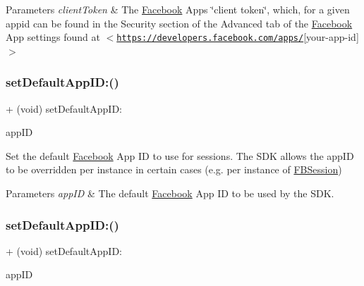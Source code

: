 \begin{DoxyParams}{Parameters}
{\em client\+Token} & The \hyperlink{interfaceFacebook}{Facebook} App\textquotesingle{}s \char`\"{}client token\char`\"{}, which, for a given appid can be found in the Security section of the Advanced tab of the \hyperlink{interfaceFacebook}{Facebook} App settings found at $<$\href{https://developers.facebook.com/apps/}{\tt https\+://developers.\+facebook.\+com/apps/}\mbox{[}your-\/app-\/id\mbox{]}$>$ \\
\hline
\end{DoxyParams}
\mbox{\label{interfaceFBSettings_aae75641f83b1caf710efd2ce72b6eb67}} 
\subsubsection{\texorpdfstring{set\+Default\+App\+I\+D\+:()}{setDefaultAppID:()}\hspace{0.1cm}{\footnotesize\ttfamily [1/5]}}
{\footnotesize\ttfamily + (void) set\+Default\+App\+I\+D\+: \begin{DoxyParamCaption}\item[{(N\+S\+String $\ast$)}]{app\+ID }\end{DoxyParamCaption}}

Set the default \hyperlink{interfaceFacebook}{Facebook} App ID to use for sessions. The S\+DK allows the app\+ID to be overridden per instance in certain cases (e.\+g. per instance of \hyperlink{interfaceFBSession}{F\+B\+Session})


\begin{DoxyParams}{Parameters}
{\em app\+ID} & The default \hyperlink{interfaceFacebook}{Facebook} App ID to be used by the S\+DK. \\
\hline
\end{DoxyParams}
\mbox{\label{interfaceFBSettings_aae75641f83b1caf710efd2ce72b6eb67}} 
\subsubsection{\texorpdfstring{set\+Default\+App\+I\+D\+:()}{setDefaultAppID:()}\hspace{0.1cm}{\footnotesize\ttfamily [2/5]}}
{\footnotesize\ttfamily + (void) set\+Default\+App\+I\+D\+: \begin{DoxyParamCaption}\item[{(N\+S\+String $\ast$)}]{app\+ID }\end{DoxyParamCaption}}

